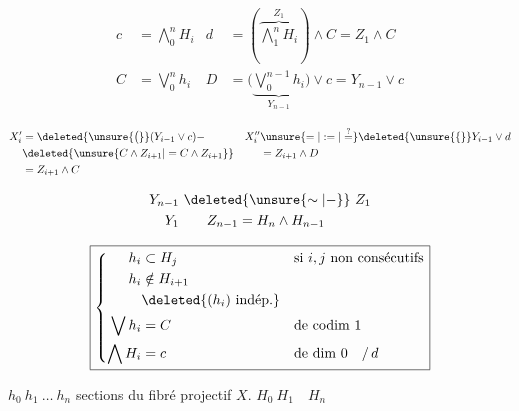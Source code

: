 \[
\begin{aligned}
c&=\bigwedge_0^n H_i &d&=(\overbrace{\bigwedge_1^n H_i}^{Z_1})\wedge C=Z_1\wedge C\\
C&=\bigvee_0^n h_i &D&=\bigl(\underbrace{\bigvee_0^{n-1}h_i}_{Y_{n-1}}\bigr)\vee c=Y_{n-1}\vee c
\end{aligned}
\]

\[
\begin{aligned}
X'_i&=\deleted{\unsure{\bigl(}}(Y_{i-1}\vee c)- & X''_i&\unsure{=|:=|\overset{?}{=}}\deleted{\unsure{\{} }Y_{i-1}\vee d\\
&\deleted{\unsure{C\wedge Z_{i+1}|=C\wedge Z_{i+1}}}& &= Z_{i+1}\wedge D\\
&=Z_{i+1}\wedge C
\end{aligned}
\]

\[
\begin{aligned}
Y_{n-1}&\ \deleted{\unsure{\sim|-}}\ Z_1\\
Y_1&\qquad Z_{n-1}=H_n\wedge H_{n-1}
\end{aligned}
\]


\[
\boxed{\left\{\begin{aligned}
 h_i&\subset H_j &&\text{si }i,j\ \text{non consécutifs}\\
 h_i&\notin H_{i+1}\\
 &\deleted{(h_i)\ \text{indép.}}\\
 \bigvee h_i&=C &&\text{de codim }1\\
 \bigwedge H_i&=c &&\text{de dim }0\quad /\,d
\end{aligned}\right.}
\]




 $h_0\ h_1\ \ldots\ h_n$ sections du fibré projectif $X$. $H_0\ H_1\quad H_n$  

